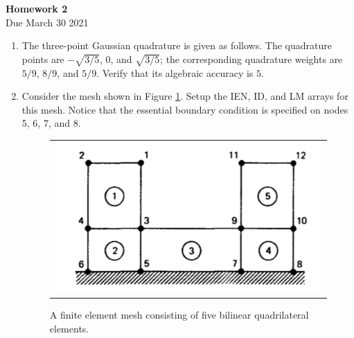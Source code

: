 \documentclass[12pt]{article}
\begin{document}
\begin{center}
\textbf{\Large
Homework 2
}\\
\normalsize Due March 30 2021





\end{center}
\begin{enumerate}
\item The three-point Gaussian quadrature is given as follows. The quadrature points are $-\sqrt{3/5}$, $0$, and $\sqrt{3/5}$; the corresponding quadrature weights are $5/9$, $8/9$, and $5/9$. Verify that its algebraic accuracy is $5$.

\item Consider the mesh shown in Figure \ref{fig:mesh}. Setup the IEN, ID, and LM arrays for this mesh. Notice that the essential boundary condition is specified on nodes 5, 6, 7, and 8.

\begin{figure}[h]
	\begin{center}
	\begin{tabular}{c}
\includegraphics[angle=0, trim=0 0 0 0, clip=true, scale = 0.5]{./mesh-ien-id-lm.pdf}
\end{tabular}
\end{center} 
\caption{A finite element mesh consisting of five bilinear quadrilateral elements.}
\label{fig:mesh}
\end{figure}


\end{enumerate}
\end{document}
